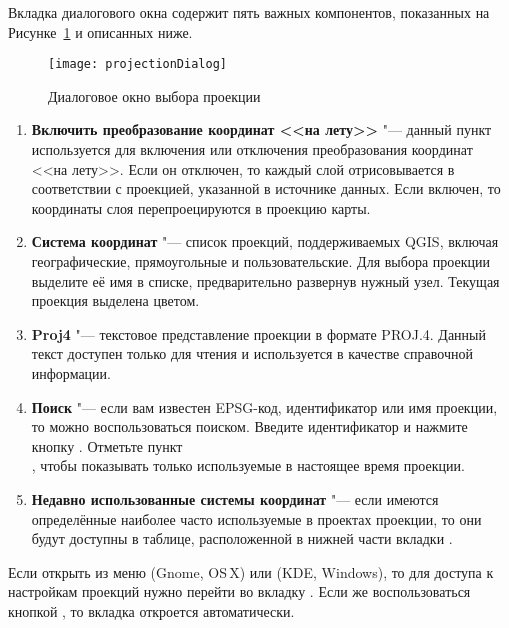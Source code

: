 Вкладка  диалогового окна 
содержит пять важных компонентов, показанных на Рисунке~\ref{fig:projections} и
описанных ниже.

\begin{figure}[ht]
   \centering
   \texttt{[image: projectionDialog]}
   \caption{Диалоговое окно выбора проекции \wincaption}\label{fig:projections}
\end{figure}

\begin{enumerate}
\item \textbf{Включить преобразование координат <<на лету>>}
"--- данный пункт используется для включения или отключения преобразования
координат <<на лету>>. Если он отключен, то каждый слой отрисовывается в
соответствии с проекцией, указанной в источнике данных. Если включен, то
координаты слоя перепроецируются в проекцию карты.
\item \textbf{Система координат} "--- список проекций, поддерживаемых QGIS,
включая географические, прямоугольные и пользовательские. Для выбора проекции
выделите её имя в списке, предварительно развернув нужный узел. Текущая
проекция выделена цветом.
\item \textbf{Proj4} "--- текстовое представление проекции в формате
PROJ.4. Данный текст доступен только для чтения и используется в
качестве справочной информации.
\item \textbf{Поиск} "--- если вам известен EPSG-код, идентификатор или имя
проекции, то можно воспользоваться поиском. Введите идентификатор и нажмите
кнопку . Отметьте пункт \\
, чтобы показывать только
используемые в настоящее время проекции.
\item \textbf{Недавно использованные системы координат} "--- если имеются
определённые наиболее часто используемые в проектах проекции, то они будут
доступны в таблице, расположенной в нижней части вкладки .
\end{enumerate}

\begin{Tip}
\caption{\textsc{Диалоговое окно Свойства проекта}}
Если открыть  из меню 
(Gnome, OS\,X) или  (KDE, Windows), то для доступа к
настройкам проекций нужно перейти во вкладку . Если
же воспользоваться кнопкой
, то вкладка
 откроется автоматически.
\end{Tip}

